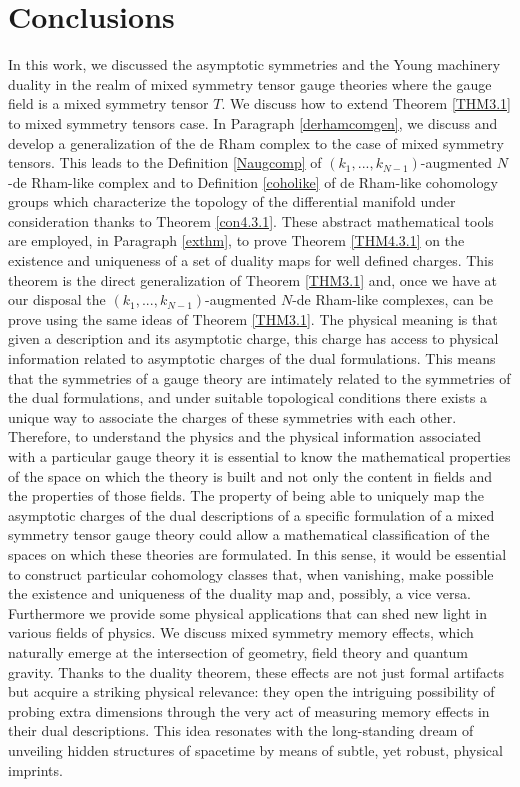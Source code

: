\documentclass[a4paper,12pt]{article}
\begin{document}
\section{Conclusions}
In this work, we discussed the asymptotic symmetries and the Young machinery duality in the realm of mixed symmetry tensor gauge theories where the gauge field is a mixed symmetry tensor $T$. We discuss how to extend Theorem \ref{THM3.1} to mixed symmetry tensors case. In Paragraph \ref{derhamcomgen}, we discuss and develop a generalization of the de Rham complex to the case of mixed symmetry tensors. This leads to the Definition \ref{Naugcomp} of $(k_1,...,k_{N-1})$-augmented $N$-de Rham-like complex and to Definition \ref{coholike} of de Rham-like cohomology groups which characterize the topology of the differential manifold under consideration thanks to Theorem \ref{con4.3.1}.  These abstract mathematical tools are employed, in Paragraph \ref{exthm}, to prove Theorem \ref{THM4.3.1} on the existence and uniqueness of a set of duality maps for well defined charges. This theorem is the direct generalization of Theorem \ref{THM3.1} and, once we have at our disposal the $(k_1,...,k_{N-1})$-augmented $N$-de Rham-like complexes, can be prove using the same ideas of Theorem \ref{THM3.1}. The physical meaning is that given a description and its asymptotic charge, this charge has access to physical information related to asymptotic charges of the dual formulations. This means that the symmetries of a gauge theory are intimately related to the symmetries of the dual formulations, and under suitable topological conditions there exists a unique way to associate the charges of these symmetries with each other. Therefore, to understand the physics and the physical information associated with a particular gauge theory it is essential to know the mathematical properties of the space on which the theory is built and not only the content in fields and the properties of those fields. The property of being able to uniquely map the asymptotic charges of the dual descriptions of a specific formulation of a mixed symmetry tensor gauge theory could allow a mathematical classification of the spaces on which these theories are formulated. In this sense, it would be essential to construct particular cohomology classes that, when vanishing, make possible the existence and uniqueness of the duality map and, possibly, a vice versa.\\
Furthermore we provide some physical applications that can shed new light in various fields of physics. We discuss mixed symmetry memory effects, which naturally emerge at the intersection of geometry, field theory and quantum gravity. Thanks to the duality theorem, these effects are not just formal artifacts but acquire a striking physical relevance: they open the intriguing possibility of probing extra dimensions through the very act of measuring memory effects in their dual descriptions. This idea resonates with the long-standing dream of unveiling hidden structures of spacetime by means of subtle, yet robust, physical imprints.
\end{document}
